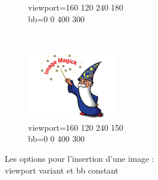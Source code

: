 \begin{figure}[h]
\begin{subfigure}[b]{0.3\textwidth}
        \caption{viewport=160 120 240 180\\bb=0 0 400 300}%
        \label{essai_h}
    \end{subfigure}
    ~
    \begin{subfigure}[b]{0.3\textwidth}
        \includegraphics[viewport=160 120 240 150,bb=0 0 400 300,width=4cm,height=3cm,clip=true]{test.jpg}
        \caption{viewport=160 120 240 150\\bb=0 0 400 300}%
        \label{essai_i}
    \end{subfigure}
    \caption{Les options pour l'insertion d'une image :\\viewport variant et bb constant}%
    \label{viewport variant et bb constant}

\end{figure}


